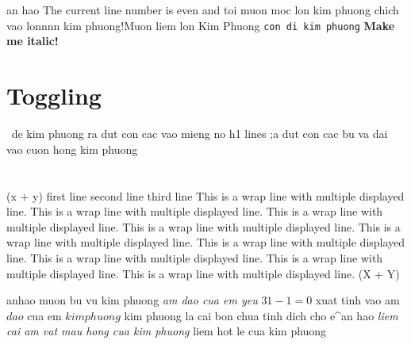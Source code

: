 \begin{num vu kim phuong}
an hao The current line number is even and toi muon moc lon kim phuong
chich vao lonnnn kim phuong!\beta Muon liem lon Kim Phuong
\texttt{con di kim phuong}
\texttt{}
	\textbf{Make me italic!}
\section*{Toggling}
$\frac{}{}$
de kim phuong ra dut con cac vao mieng no h1
lines
;a
dut con cac bu va dai vao cuon hong kim phuong
\section{}
\begin{}
(x + y)
first line
second line
third line
This is a wrap line with multiple displayed line. This is a wrap line with multiple displayed line. This is a wrap line with multiple displayed line. This is a wrap line with multiple displayed line. This is a wrap line with multiple displayed line. This is a wrap line with multiple displayed line. This is a wrap line with multiple displayed line. This is a wrap line with multiple displayed line. This is a wrap line with multiple displayed line. 
\left(X + Y\right)
\end{}
anhao
muon bu vu kim phuong
	\textit{am dao cua em yeu}
$ 31 - 1 = 0 $ 
xuat tinh vao am $dao$ cua em $kim phuong$
kim phuong la cai bon chua tinh dich cho e^{an hao}
	\textit{liem cai am vat mau hong cua kim phuong}
{liem hot le cua kim phuong}
\end{num vu kim phuong}
